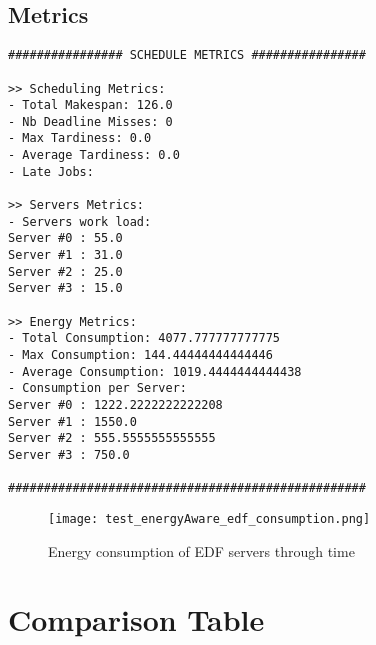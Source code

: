 \documentclass[./report.tex]{subfiles}
\begin{document}
\newpage
\subsection{Metrics}
\begin{lstlisting}[style=txt, caption={Metrics for EDF on multiple energy aware servers}]
################ SCHEDULE METRICS ################

>> Scheduling Metrics: 
- Total Makespan: 126.0
- Nb Deadline Misses: 0
- Max Tardiness: 0.0
- Average Tardiness: 0.0
- Late Jobs: 

>> Servers Metrics: 
- Servers work load:
Server #0 : 55.0
Server #1 : 31.0
Server #2 : 25.0
Server #3 : 15.0

>> Energy Metrics: 
- Total Consumption: 4077.777777777775
- Max Consumption: 144.44444444444446
- Average Consumption: 1019.4444444444438
- Consumption per Server: 
Server #0 : 1222.2222222222208
Server #1 : 1550.0
Server #2 : 555.5555555555555
Server #3 : 750.0

##################################################
\end{lstlisting}

\begin{figure}[!h]
	\center
	\hspace*{-5em} \texttt{[image: test\_energyAware\_edf\_consumption.png]}
	\caption{Energy consumption of EDF servers through time}
	\label{fig:edf_consumption} 
\end{figure}


\newpage
\section{Comparison Table}
\end{document}
